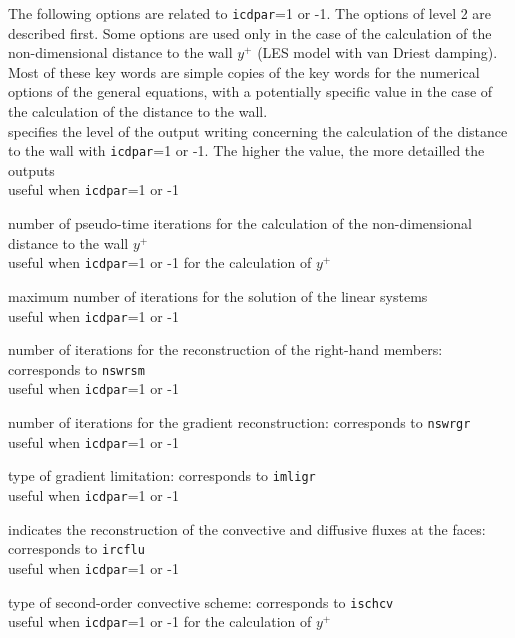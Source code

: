 The following options are related to {\tt icdpar}=1 or -1. The options of
level 2 are described first. Some options are used only in the case of
the calculation of the non-dimensional distance to the wall $y^+$ (LES model with
van Driest damping). Most of these key words are simple copies of the
key words for the numerical options of the general equations, with a potentially
specific value in the case of the calculation of the distance to the wall.\\

{specifies the level of the output writing concerning the calculation of the
distance to the wall with {\tt icdpar}=1 or -1. The higher the value, the more
detailled the outputs\\
useful when {\tt icdpar}=1 or -1}

{number of pseudo-time iterations for the calculation of the non-dimensional
distance to the wall $y^+$\\
useful when {\tt icdpar}=1 or -1 for the calculation of $y^+$}

{maximum number of iterations for the solution of the linear systems\\
useful when {\tt icdpar}=1 or -1}

{number of iterations for the reconstruction of the right-hand members:
corresponds to {\tt nswrsm}\\
useful when {\tt icdpar}=1 or -1}

{number of iterations for the gradient reconstruction: corresponds to {\tt nswrgr}\\
useful when {\tt icdpar}=1 or -1}

{type of gradient limitation: corresponds to {\tt imligr}\\
useful when {\tt icdpar}=1 or -1}

{indicates the reconstruction of the convective and diffusive fluxes at
the faces: corresponds to {\tt ircflu}\\
useful when {\tt icdpar}=1 or -1}

{type of second-order convective scheme: corresponds to {\tt ischcv}\\
useful when {\tt icdpar}=1 or -1 for the calculation of $y^+$}


